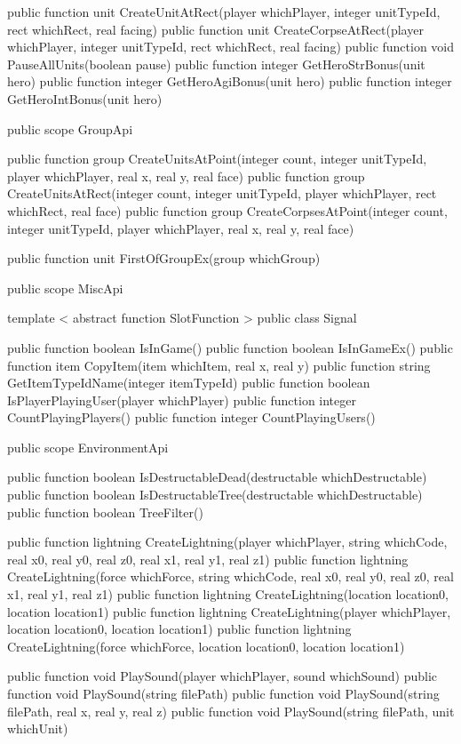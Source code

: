 {{		public function unit CreateUnitAtRect(player whichPlayer, integer unitTypeId, rect whichRect, real facing)
		public function unit CreateCorpseAtRect(player whichPlayer, integer unitTypeId, rect whichRect, real facing)
		public function void PauseAllUnits(boolean pause)
		public function integer GetHeroStrBonus(unit hero)
		public function integer GetHeroAgiBonus(unit hero)
		public function integer GetHeroIntBonus(unit hero)
	}

	public scope GroupApi
	{
		public function group CreateUnitsAtPoint(integer count, integer unitTypeId, player whichPlayer, real x, real y, real face)
		public function group CreateUnitsAtRect(integer count, integer unitTypeId, player whichPlayer, rect whichRect, real face)
		public function group CreateCorpsesAtPoint(integer count, integer unitTypeId, player whichPlayer, real x, real y, real face)

		public function unit FirstOfGroupEx(group whichGroup)
	}

	public scope MiscApi
	{
		template < abstract function SlotFunction >
		public class Signal

		public function boolean IsInGame()
		public function boolean IsInGameEx()
		public function item CopyItem(item whichItem, real x, real y)
		public function string GetItemTypeIdName(integer itemTypeId)
		public function boolean IsPlayerPlayingUser(player whichPlayer)
		public function integer CountPlayingPlayers()
		public function integer CountPlayingUsers()

		

	}

	public scope EnvironmentApi
	{
		public function boolean IsDestructableDead(destructable whichDestructable)
		public function boolean IsDestructableTree(destructable whichDestructable)
		public function boolean TreeFilter()

		public function lightning CreateLightning(player whichPlayer, string whichCode, real x0, real y0, real z0, real x1, real y1, real z1)
		public function lightning CreateLightning(force whichForce, string whichCode, real x0, real y0, real z0, real x1, real y1, real z1)
		public function lightning CreateLightning(location location0, location location1)
		public function lightning CreateLightning(player whichPlayer, location location0, location location1)
		public function lightning CreateLightning(force whichForce, location location0, location location1)

		public function void PlaySound(player whichPlayer, sound whichSound)
		public function void PlaySound(string filePath)
		public function void PlaySound(string filePath, real x, real y, real z)
		public function void PlaySound(string filePath, unit whichUnit)

}}
